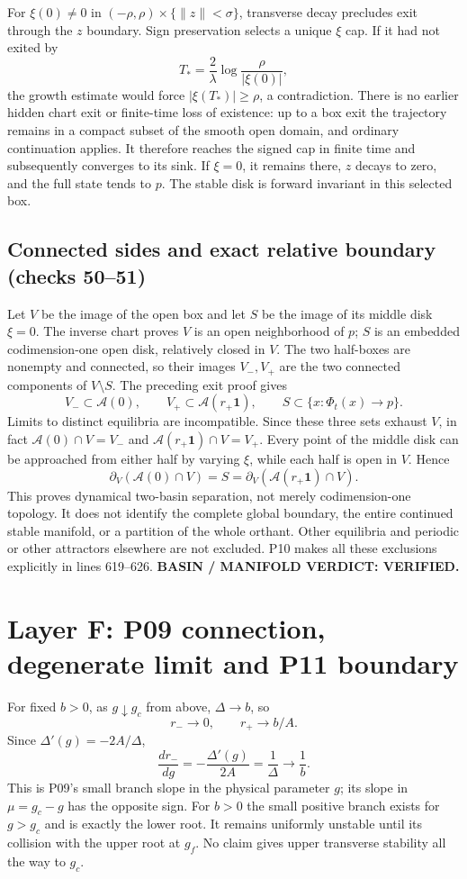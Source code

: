 \documentclass[11pt]{article}
\newcommand{\one}{\mathbf1}
\newcommand{\norm}[1]{\lVert#1\rVert}
\begin{document}
For $\xi(0)\ne0$ in
$(-\rho,\rho)\times\{\norm z<\sigma\}$, transverse decay precludes
exit through the $z$ boundary. Sign preservation selects a unique $\xi$ cap.
If it had not exited by
\[
 T_* =\frac2\lambda\log\frac{\rho}{|\xi(0)|},
\]
the growth estimate would force $|\xi(T_*)|\ge\rho$, a contradiction.
There is no earlier hidden chart exit or finite-time loss of existence:
up to a box exit the trajectory remains in a compact subset of the smooth
open domain, and ordinary continuation applies. It therefore reaches the
signed cap in finite time and subsequently converges to its sink.
If $\xi=0$, it remains there, $z$ decays to zero, and the full state tends
to $p$. The stable disk is forward invariant in this selected box.

\subsection{Connected sides and exact relative boundary (checks 50--51)}
Let $V$ be the image of the open box and let $S$ be the image of its middle
disk $\xi=0$. The inverse chart proves $V$ is an open neighborhood of $p$;
$S$ is an embedded codimension-one open disk, relatively closed in $V$.
The two half-boxes are nonempty and connected, so their images $V_-,V_+$
are the two connected components of $V\setminus S$.
The preceding exit proof gives
\[
 V_-\subset\mathcal A(0),\qquad V_+\subset\mathcal A(r_+\one),
 \qquad S\subset\{x:\Phi_t(x)\to p\}.
\]
Limits to distinct equilibria are incompatible. Since these three sets
exhaust $V$, in fact $\mathcal A(0)\cap V=V_-$ and
$\mathcal A(r_+\one)\cap V=V_+$. Every point of the middle disk can be
approached from either half by varying $\xi$, while each half is open in
$V$. Hence
\[
 \partial_V(\mathcal A(0)\cap V)
 =S=\partial_V(\mathcal A(r_+\one)\cap V).
\]
This proves dynamical two-basin separation, not merely codimension-one
topology. It does not identify the complete global boundary, the entire
continued stable manifold, or a partition of the whole orthant. Other
equilibria and periodic or other attractors elsewhere are not excluded.
P10 makes all these exclusions explicitly in lines 619--626.
\textbf{BASIN / MANIFOLD VERDICT: VERIFIED.}

\section{Layer F: P09 connection, degenerate limit and P11 boundary}
\label{sec:F}
For fixed $b>0$, as $g\downarrow g_c$ from above, $\Delta\to b$, so
\[
 r_-\to0,\qquad r_+\to b/A.
\]
Since $\Delta'(g)=-2A/\Delta$,
\[
 \frac{dr_-}{dg}=-\frac{\Delta'(g)}{2A}
                 =\frac1\Delta\longrightarrow\frac1b.
\]
This is P09's small branch slope in the physical parameter $g$; its slope
in $\mu=g_c-g$ has the opposite sign. For $b>0$ the small positive branch
exists for $g>g_c$ and is exactly the lower root. It remains uniformly
unstable until its collision with the upper root at $g_f$. No claim gives
upper transverse stability all the way to $g_c$.
\end{document}
